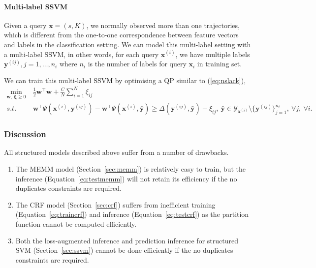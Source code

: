 \paragraph{Multi-label SSVM}
Given a query $\mathbf{x} = (s, K)$, we normally observed more than one trajectories, which is different from the one-to-one correspondence 
between feature vectors and labels in the classification setting.
We can model this multi-label setting with a multi-label SSVM, in other words,
for each query $\mathbf{x}^{(i)}$, we have multiple labels $\mathbf{y}^{(ij)}, j=1,\dots,n_i$ 
where $n_i$ is the number of labels for query $\mathbf{x}_i$ in training set. 

We can train this multi-label SSVM by optimising a QP similar to (\ref{eq:nslack}),
\begin{equation}
\label{eq:nslack_ml}
\begin{aligned}
\min_{\mathbf{w}, ~\bm{\xi} \ge 0} ~& \frac{1}{2} \mathbf{w}^\top \mathbf{w} + \frac{C}{N} \sum_{i=1}^N \xi_{ij} \\
s.t.~~ ~& \mathbf{w}^\top \Psi(\mathbf{x}^{(i)}, \mathbf{y}^{(ij)}) - \mathbf{w}^\top \Psi(\mathbf{x}^{(i)}, \bar{\mathbf{y}}) \ge 
       \Delta(\mathbf{y}^{(ij)}, \bar{\mathbf{y}}) - \xi_{ij}, 
~\bar{\mathbf{y}} \in \mathcal{Y}_{\mathbf{x}^{(i)}} \setminus \{\mathbf{y}^{(ij)}\}_{j=1}^{n_i},~\forall j,~\forall i.
\end{aligned}
\end{equation}



\subsubsection{Discussion}

All structured models described above suffer from a number of drawbacks.
\begin{enumerate}
\item The MEMM model (Section~\ref{sec:memm}) is relatively easy to train, 
      but the inference (Equation~\ref{eq:testmemm}) will not retain its efficiency if the no duplicates constraints are required.
\item The CRF model (Section~\ref{sec:crf}) suffers from inefficient training (Equation~\ref{eq:traincrf}) and 
      inference (Equation~\ref{eq:testcrf}) as the partition function cannot be computed efficiently.
\item Both the loss-augmented inference and prediction inference for structured SVM (Section~\ref{sec:ssvm}) cannot be done efficiently 
      if the no duplicates constraints are required.
\end{enumerate}

